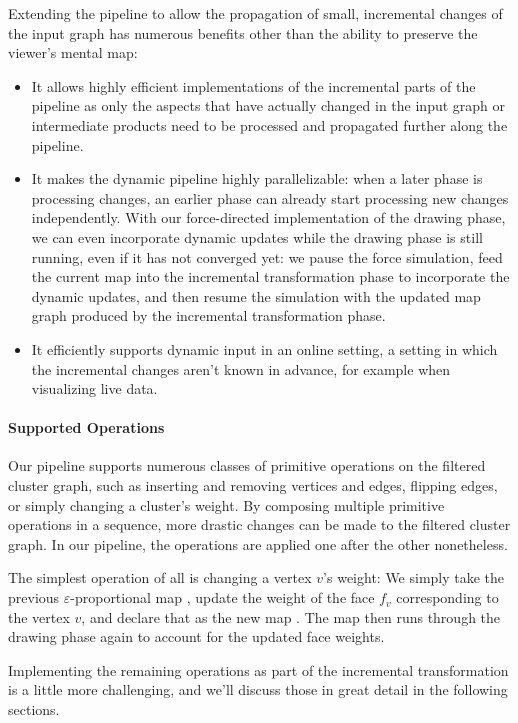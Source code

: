 Extending the pipeline to allow the propagation of small, incremental changes of the input graph has numerous benefits other than the ability to preserve the viewer's mental map:
%
\begin{itemize}
\item It allows highly efficient implementations of the incremental parts of the pipeline as only the aspects that have actually changed in the input graph or intermediate products need to be processed and propagated further along the pipeline.
\item It makes the dynamic pipeline highly parallelizable: when a later phase is processing changes, an earlier phase can already start processing new changes independently.
With our force-directed implementation of the drawing phase, we can even incorporate dynamic updates while the drawing phase is still running, even if it has not converged yet: we pause the force simulation, feed the current map  into the incremental transformation phase to incorporate the dynamic updates, and then resume the simulation with the updated map graph  produced by the incremental transformation phase.
\item It efficiently supports dynamic input in an online setting, \ie{} a setting in which the incremental changes aren't known in advance, for example when visualizing live data.
\end{itemize}



\paragraph{Supported Operations}

Our pipeline supports numerous classes of primitive operations on the filtered cluster graph, such as inserting and removing vertices and edges, flipping edges, or simply changing a cluster's weight.
By composing multiple primitive operations in a sequence, more drastic changes can be made to the filtered cluster graph.
In our pipeline, the operations are applied one after the other nonetheless.

The simplest operation of all is changing a vertex $v$'s weight: We simply take the previous $\varepsilon$-proportional map , update the weight of the face $f_v$ corresponding to the vertex $v$, and declare that as the new map .
The map  then runs through the drawing phase again to account for the updated face weights.

Implementing the remaining operations as part of the incremental transformation is a little more challenging, and we'll discuss those in great detail in the following sections.

\clearpage

\clearpage

\clearpage

